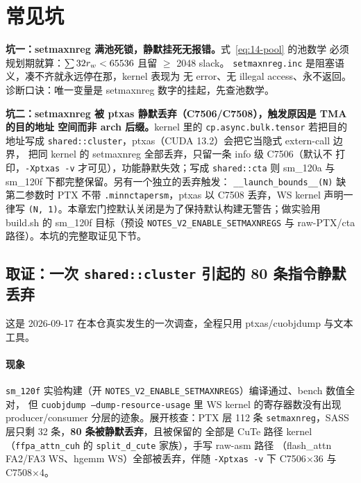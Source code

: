\section{常见坑}

\textbf{坑一：setmaxnreg 满池死锁，静默挂死无报错。}式~\ref{eq:14-pool} 的池数学
必须规划期就算：$\sum 32 r\sb{w} < 65536$ 且留 $\ge$ 2048 slack。
\texttt{setmaxnreg.\allowbreak{}inc} 是阻塞语义，凑不齐就永远停在那，kernel 表现为
无 error、无 illegal access、永不返回。诊断口诀：唯一变量是 setmaxnreg
数字的挂起，先查池数学。

\textbf{坑二：setmaxnreg 被 ptxas 静默丢弃（C7506/C7508），触发原因是 TMA 的目的地址
空间而非 arch 后缀。}\allowbreak{}kernel 里的
\texttt{cp.\allowbreak{}async.\allowbreak{}bulk.\allowbreak{}tensor} 若把目的地址写成
\texttt{shared::cluster}，ptxas（CUDA 13.2）会把它当隐式 extern-call 边界，
把同 kernel 的 setmaxnreg 全部丢弃，只留一条 info 级 C7506（默认不
打印，\texttt{-Xptxas -v} 才可见），功能静默失效；写成 \texttt{shared::cta}
则 sm\_120a 与 sm\_120f 下都完整保留。另有一个独立的丢弃触发：
\texttt{\_\allowbreak{}\_\allowbreak{}launch\_\allowbreak{}bounds\_\allowbreak{}\_\allowbreak{}(N)} 缺第二参数时 PTX 不带
\texttt{.minnctapersm}，ptxas 以 C7508 丢弃，WS kernel 声明一律写
\texttt{(N, 1)}。本章宏门控默认关闭是为了保持默认构建无警告；做实验用
build.sh 的 sm\_120f 目标（预设 \texttt{NOTES\_\allowbreak{}V2\_\allowbreak{}ENABLE\_\allowbreak{}SETMAXNREGS}
与 raw-PTX/cta 路径）。本坑的完整取证见下节。

\subsection*{取证：一次 \texttt{shared::cluster} 引起的 80 条指令静默丢弃}

这是 2026-09-17 在本仓真实发生的一次调查，全程只用 ptxas/cuobjdump 与文本工具。

\paragraph{现象} \texttt{sm\_120f} 实验构建（开
\texttt{NOTES\_\allowbreak{}V2\_\allowbreak{}ENABLE\_\allowbreak{}SETMAXNREGS}）编译通过、bench 数值全对，
但 \texttt{cuobjdump --dump-resource-usage} 里 WS kernel 的寄存器数没有出现
producer/consumer 分层的迹象。展开核查：PTX 层 112 条
\texttt{setmaxnreg}，SASS 层只剩 32 条，\textbf{80 条被静默丢弃}，且被保留的
全部是 CuTe 路径 kernel（\texttt{ffpa\_\allowbreak{}attn\_\allowbreak{}cuh} 的
\texttt{split\_\allowbreak{}d\_\allowbreak{}cute} 家族），手写 raw-asm 路径
（flash\_attn FA2/FA3 WS、hgemm WS）全部被丢弃，伴随
\texttt{-Xptxas -v} 下 C7506$\times$36 与 C7508$\times$4。

